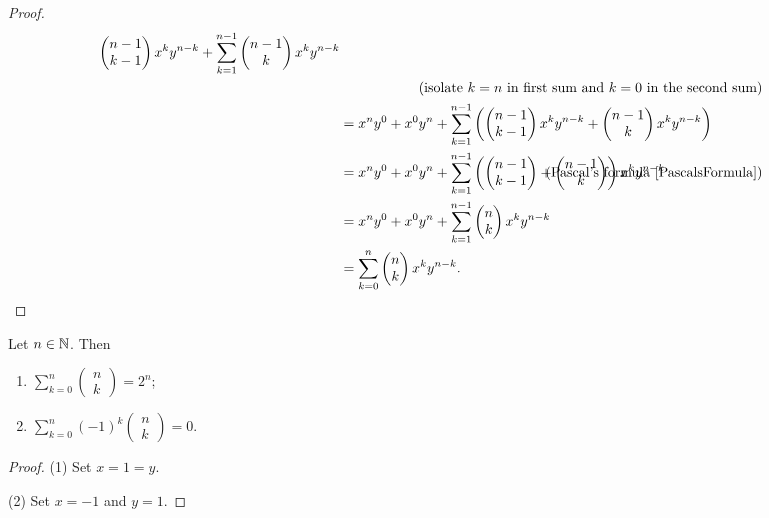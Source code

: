 \begin{proof}
\begin{align*}
\begin{pmatrix}
n-1 \\ k-1
\end{pmatrix}x^{k} y^{n-k} + \sum_{k=1}^{n-1} \begin{pmatrix}
n-1 \\ k
\end{pmatrix}x^{k} y^{n-k} \\
&&\hspace{-22em}\text{(isolate $k=n$ in first sum and $k=0$ in the second sum)}& \\
&= x^ny^{0} + x^0y^n + \sum_{k=1}^{n-1} \left(\begin{pmatrix}
n-1 \\ k-1
\end{pmatrix}x^{k} y^{n-k} + \begin{pmatrix}
n-1 \\ k
\end{pmatrix}x^{k} y^{n-k}\right) \\
&= x^ny^{0} + x^0y^n + \sum_{k=1}^{n-1} \left(\begin{pmatrix}
n-1 \\ k-1
\end{pmatrix} + \begin{pmatrix}
n-1 \\ k
\end{pmatrix}\right)x^{k} y^{n-k} &\hspace{-22em}\text{(Pascal's formula \ref{PascalsFormula})}& \\
&= x^ny^{0} + x^0y^n + \sum_{k=1}^{n-1} \begin{pmatrix}
n \\ k
\end{pmatrix}x^{k} y^{n-k} \\
&= \sum_{k=0}^{n} \begin{pmatrix}
n \\ k
\end{pmatrix}x^{k} y^{n-k}.
\end{align*}
\end{proof}
\begin{corollary}
Let $n\in \mathbb{N}$. Then
\begin{enumerate}
\item $\sum_{k=0}^n \begin{pmatrix}
n \\ k
\end{pmatrix} = 2^n$;
\item $\sum_{k=0}^n (-1)^k\begin{pmatrix}
n \\ k
\end{pmatrix} = 0$.
\end{enumerate}
\end{corollary}
\begin{proof}
(1) Set $x = 1 = y$.

(2) Set $x = -1$ and $y = 1$.
\end{proof}

